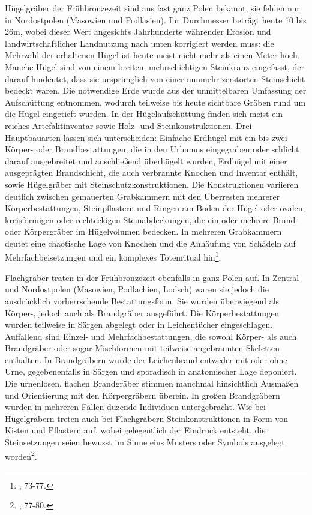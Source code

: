 \documentclass[openany,twoside,twocolumn]{book}
\let\rmarkdownfootnote\footnote%
\def\footnote{\protect\rmarkdownfootnote}
\begin{document}
Hügelgräber der Frühbronzezeit sind aus fast ganz Polen bekannt, sie
fehlen nur in Nordostpolen (Masowien und Podlasien). Ihr Durchmesser
beträgt heute 10 bis 26m, wobei dieser Wert angesichts Jahrhunderte
währender Erosion und landwirtschaftlicher Landnutzung nach unten
korrigiert werden muss: die Mehrzahl der erhaltenen Hügel ist heute
meist nicht mehr als einen Meter hoch. Manche Hügel sind von einem
breiten, mehrschichtigen Steinkranz eingefasst, der darauf hindeutet,
dass sie ursprünglich von einer nunmehr zerstörten Steinschicht bedeckt
waren. Die notwendige Erde wurde aus der unmittelbaren Umfassung der
Aufschüttung entnommen, wodurch teilweise bis heute sichtbare Gräben
rund um die Hügel eingetieft wurden. In der Hügelaufschüttung finden
sich meist ein reiches Artefaktinventar sowie Holz- und
Steinkonstruktionen. Drei Hauptbauarten lassen sich unterscheiden:
Einfache Erdhügel mit ein bis zwei Körper- oder Brandbestattungen, die
in den Urhumus eingegraben oder schlicht darauf ausgebreitet und
anschließend überhügelt wurden, Erdhügel mit einer ausgeprägten
Brandschicht, die auch verbrannte Knochen und Inventar enthält, sowie
Hügelgräber mit Steinschutzkonstruktionen. Die Konstruktionen variieren
deutlich zwischen gemauerten Grabkammern mit den Überresten mehrerer
Körperbestattungen, Steinpflastern und Ringen am Boden der Hügel oder
ovalen, kreisförmigen oder rechteckigen Steinabdeckungen, die ein oder
mehrere Brand- oder Körpergräber im Hügelvolumen bedecken. In mehreren
Grabkammern deutet eine chaotische Lage von Knochen und die Anhäufung
von Schädeln auf Mehrfachbeisetzungen und ein komplexes Totenritual
hin\footnote{\textcite{dabrowski_aeltere_2004}, 73-77.}.

Flachgräber traten in der Frühbronzezeit ebenfalls in ganz Polen auf. In
Zentral- und Nordostpolen (Masowien, Podlachien, Lodsch) waren sie
jedoch die ausdrücklich vorherrschende Bestattungsform. Sie wurden
überwiegend als Körper-, jedoch auch als Brandgräber ausgeführt. Die
Körperbestattungen wurden teilweise in Särgen abgelegt oder in
Leichentücher eingeschlagen. Auffallend sind Einzel- und
Mehrfachbestattungen, die sowohl Körper- als auch Brandgräber oder sogar
Mischformen mit teilweise angebrannten Skeletten enthalten. In
Brandgräbern wurde der Leichenbrand entweder mit oder ohne Urne,
gegebenenfalls in Särgen und sporadisch in anatomischer Lage deponiert.
Die urnenlosen, flachen Brandgräber stimmen manchmal hinsichtlich
Ausmaßen und Orientierung mit den Körpergräbern überein. In großen
Brandgräbern wurden in mehreren Fällen duzende Individuen untergebracht.
Wie bei Hügelgräbern treten auch bei Flachgräbern Steinkonstruktionen in
Form von Kisten und Pflastern auf, wobei gelegentlich der Eindruck
entsteht, die Steinsetzungen seien bewusst im Sinne eins Musters oder
Symbols ausgelegt worden\footnote{\textcite{dabrowski_aeltere_2004},
  77-80.}.
\end{document}
